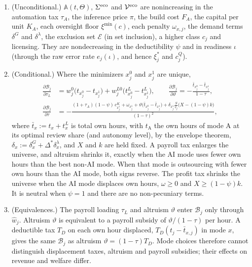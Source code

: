 \begin{proposition}\label{prop:ext-statics}
\begin{enumerate}
\item[(a)] (Unconditional.) $\mathbb A(t,\Theta)$, $\Sigma^{\rm eco}$ and $\mathcal V^{\rm eco}$ are nonincreasing in the automation tax $\tau_A$, the inference price $\pi$, the build cost $F_A$, the capital per unit $K_A$, each oversight floor $\xi^{\min}(c)$, each penalty $\omega_{x,j}$, the demand terms $\delta^G$ and $\delta^\lambda$, the exclusion set $\mathcal E$ (in set inclusion), a higher class $c_j$ and licensing. They are nondecreasing in the deductibility $\psi$ and in readiness $\iota$ (through the raw error rate $e_j(\iota)$, and hence $\xi^*_j$ and $c^Q_j$).
\item[(b)] (Conditional.) Where the minimizers $x^0_j$ and $x^1_j$ are unique,
\begin{align}
\frac{\partial\mathcal B_j}{\partial\tau_L}&=w^0_j\bigl(t_{x^0_j}-t_{x^1_j}\bigr)+w^{L0}_j\bigl(t^L_{x^0_j}-t^L_{x^1_j}\bigr),\qquad
\frac{\partial\mathcal B_j}{\partial\vartheta}=-\frac{\bar t_{x^0_j}-\bar t_{x^1_j}}{1-\tau},\label{eq:ext-dBdL}\\
\frac{\partial\mathcal B_j}{\partial\tau}&=-\frac{(1+\tau_A)(1-\psi)\,c^K_{x^1_j}+\omega_{x^1_j}+\vartheta\bigl(\bar t_{x^0_j}-\bar t_{x^1_j}\bigr)+\delta_{x^1_j}\frac{S}{v_j}\bigl(X-(1-\psi)k\bigr)}{(1-\tau)^2},\label{eq:ext-dBdtau}
\end{align}
where $\bar t_x:=t_x+t^L_x$ is total own hours, with $t_{\mathrm A}$ the own hours of mode A at its optimal review share (and autonomy level), by the envelope theorem, $\delta_x:=\delta^G_x+\Delta^*\delta^\lambda_x$, and $X$ and $k$ are held fixed. A payroll tax enlarges the universe, and altruism shrinks it, exactly when the AI mode uses fewer own hours than the best non-AI mode. When that mode is outsourcing with fewer own hours than the AI mode, both signs reverse. The profit tax shrinks the universe when the AI mode displaces own hours, $\omega\ge0$ and $X\ge(1-\psi)k$. It is neutral when $\psi=1$ and there are no non-pecuniary terms.
\item[(c)] (Equivalences.) The payroll loading $\tau_L$ and altruism $\vartheta$ enter $\mathcal B_j$ only through $\hat w_j$. Altruism $\vartheta$ is equivalent to a payroll subsidy of $\vartheta/(1-\tau)$ per hour. A deductible tax $T_D$ on each own hour displaced, $T_D(t_j-\bar t_{x,j})$ in mode $x$, gives the same $\mathcal B_j$ as altruism $\vartheta=(1-\tau)T_D$. Mode choices therefore cannot distinguish displacement taxes, altruism and payroll subsidies; their effects on revenue and welfare differ.
\end{enumerate}
\end{proposition}

